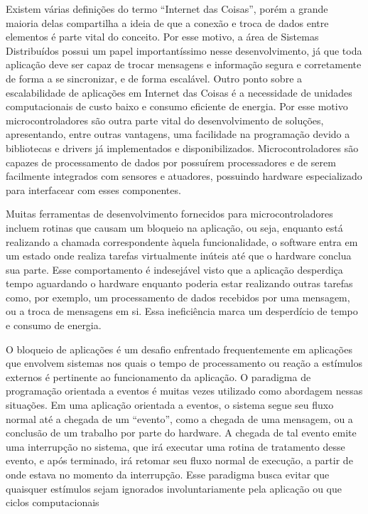\documentclass{article}
\begin{document}
\tab Existem várias definições do termo “Internet das
Coisas”, porém a grande maioria delas compartilha a ideia de que a conexão e troca de dados
entre elementos é parte vital do conceito. Por esse motivo, a área de Sistemas Distribuídos possui um
papel importantíssimo nesse desenvolvimento, já que toda aplicação deve ser capaz de trocar
mensagens e informação segura e corretamente de forma a se sincronizar, e de forma escalável. \cite{singh2014}
Outro ponto sobre a escalabilidade de aplicações em Internet das Coisas é a necessidade de unidades
computacionais de custo baixo e consumo eficiente de energia. Por esse motivo microcontroladores
são outra parte vital do desenvolvimento de soluções, apresentando, entre outras vantagens, uma
facilidade na programação devido a bibliotecas e drivers já implementados e disponibilizados.
Microcontroladores são capazes de processamento de dados por possuírem processadores e de
serem facilmente integrados com sensores e atuadores, possuindo hardware especializado para
interfacear com esses componentes.
\par Muitas ferramentas de desenvolvimento fornecidos para microcontroladores incluem rotinas que causam um bloqueio na
aplicação, ou seja, enquanto está realizando a chamada correspondente àquela funcionalidade, o
software entra em um estado onde realiza tarefas virtualmente inúteis até que o hardware conclua sua
parte. Esse comportamento é indesejável visto que a aplicação desperdiça tempo aguardando o
hardware enquanto poderia estar realizando outras tarefas como, por exemplo, um processamento de
dados recebidos por uma mensagem, ou a troca de mensagens em si. Essa ineficiência marca um
desperdício de tempo e consumo de energia.
\par O bloqueio de aplicações é um desafio enfrentado frequentemente em aplicações que envolvem
sistemas nos quais o tempo de processamento ou reação a estímulos externos é pertinente ao
funcionamento da aplicação. O paradigma de programação orientada a eventos é muitas vezes
utilizado como abordagem nessas situações. Em uma aplicação orientada a eventos, o sistema segue
seu fluxo normal até a chegada de um “evento”, como a chegada de uma mensagem, ou a conclusão
de um trabalho por parte do hardware. A chegada de tal evento emite uma interrupção no sistema, que
irá executar uma rotina de tratamento desse evento, e após terminado, irá retomar seu fluxo normal
de execução, a partir de onde estava no momento da interrupção. Esse paradigma busca evitar que
quaisquer estímulos sejam ignorados involuntariamente pela aplicação ou que ciclos computacionais
\end{document}
